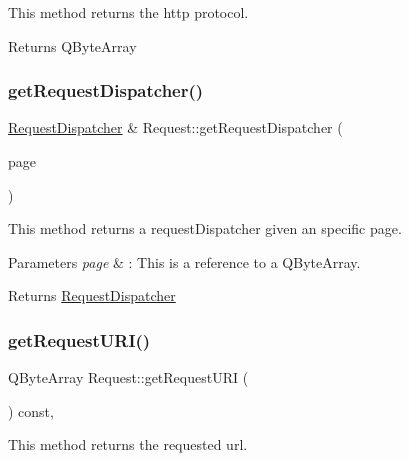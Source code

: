 This method returns the http protocol. 

\begin{DoxyReturn}{Returns}
Q\+Byte\+Array 
\end{DoxyReturn}
\mbox{\label{class_request_a595822f6e39bf04930f9ad580a5ba34c}} 
\subsubsection{\texorpdfstring{get\+Request\+Dispatcher()}{getRequestDispatcher()}}
{\footnotesize\ttfamily \hyperlink{class_request_dispatcher}{Request\+Dispatcher} \& Request\+::get\+Request\+Dispatcher (\begin{DoxyParamCaption}\item[{const Q\+String \&}]{page }\end{DoxyParamCaption})}



This method returns a request\+Dispatcher given an specific page. 


\begin{DoxyParams}{Parameters}
{\em page} & \+: This is a reference to a Q\+Byte\+Array. \\
\hline
\end{DoxyParams}
\begin{DoxyReturn}{Returns}
\hyperlink{class_request_dispatcher}{Request\+Dispatcher} 
\end{DoxyReturn}
\mbox{\label{class_request_aa5f623afcbe306d552a495156e3bb9c1}} 
\subsubsection{\texorpdfstring{get\+Request\+U\+R\+I()}{getRequestURI()}}
{\footnotesize\ttfamily Q\+Byte\+Array Request\+::get\+Request\+U\+RI (\begin{DoxyParamCaption}{ }\end{DoxyParamCaption}) const\hspace{0.3cm}{\ttfamily [inline]}, {\ttfamily [noexcept]}}



This method returns the requested url. 

